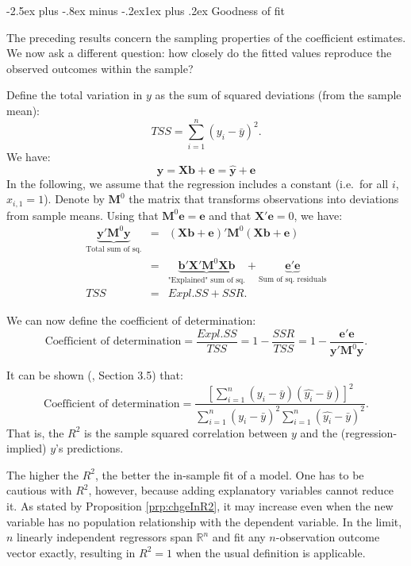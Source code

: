\documentclass[
  11pt,
]{book}
\makeatletter
\renewcommand\subsection{\@startsection{subsection}{2}{\z@}
  {-2.5ex plus -.8ex minus -.2ex}{1ex plus .2ex}
  {\normalfont\large\bfseries\color{TextbookInk}}}
\theoremstyle{definition}
\theoremstyle{definition}
\theoremstyle{definition}
\theoremstyle{definition}
\theoremstyle{remark}
\makeatother
\begin{document}
\subsection{Goodness of fit}\label{goodness-of-fit}

The preceding results concern the sampling properties of the coefficient estimates. We now ask a different question: how closely do the fitted values reproduce the observed outcomes within the sample?

Define the total variation in \(y\) as the sum of squared deviations (from the sample mean):
\[
TSS = \sum_{i=1}^{n} (y_i - \bar{y})^2.
\]
We have:
\[
\mathbf{y} = \mathbf{X}\mathbf{b} + \mathbf{e} = \hat{\mathbf{y}} + \mathbf{e}
\]
In the following, we assume that the regression includes a constant (i.e.~for all \(i\), \(x_{i,1}=1\)). Denote by \(\mathbf{M}^0\) the matrix that transforms observations into deviations from sample means. Using that \(\mathbf{M}^0 \mathbf{e} = \mathbf{e}\) and that \(\mathbf{X}' \mathbf{e}=0\), we have:
\begin{eqnarray*}
\underbrace{\mathbf{y}'\mathbf{M}^0\mathbf{y}}_{\mbox{Total sum of sq.}} &=& (\mathbf{X}\mathbf{b} + \mathbf{e})' \mathbf{M}^0 (\mathbf{X}\mathbf{b} + \mathbf{e})\\
&=& \underbrace{\mathbf{b}' \mathbf{X}' \mathbf{M}^0 \mathbf{X}\mathbf{b}}_{\mbox{"Explained" sum of sq.}} + \underbrace{\mathbf{e}'\mathbf{e}}_{\mbox{Sum of sq. residuals}}\\
TSS &=& Expl.SS + SSR.
\end{eqnarray*}

We can now define the coefficient of determination:
\begin{equation}
\boxed{\mbox{Coefficient of determination} = \frac{Expl.SS}{TSS} = 1 - \frac{SSR}{TSS} = 1 - \frac{\mathbf{e}'\mathbf{e}}{\mathbf{y}'\mathbf{M}^0\mathbf{y}}.}\label{eq:RR2}
\end{equation}

It can be shown (\citet{Greene2003Econometric}, Section 3.5) that:
\[
\mbox{Coefficient of determination} = \frac{[\sum_{i=1}^n(y_i - \bar{y})(\hat{y_i} - \bar{y})]^2}{\sum_{i=1}^n(y_i - \bar{y})^2 \sum_{i=1}^n(\hat{y_i} - \bar{y})^2}.
\]
That is, the \(R^2\) is the sample squared correlation between \(y\) and the (regression-implied) \(y\)'s predictions.

The higher the \(R^2\), the better the in-sample fit of a model. One has to be cautious with \(R^2\), however, because adding explanatory variables cannot reduce it. As stated by Proposition \ref{prp:chgeInR2}, it may increase even when the new variable has no population relationship with the dependent variable. In the limit, \(n\) linearly independent regressors span \(\mathbb{R}^n\) and fit any \(n\)-observation outcome vector exactly, resulting in \(R^2=1\) when the usual definition is applicable.
\end{document}
